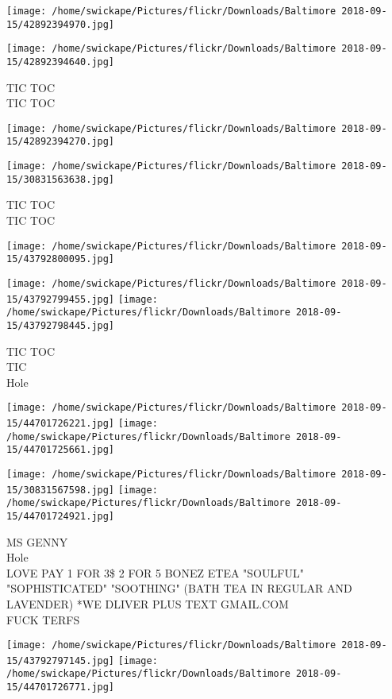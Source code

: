 \documentclass[10pt,letterpaper]{article}
\begin{document}
\texttt{[image: /home/swickape/Pictures/flickr/Downloads/Baltimore 2018-09-15/42892394970.jpg]}

\vspace{0.25in}
\texttt{[image: /home/swickape/Pictures/flickr/Downloads/Baltimore 2018-09-15/42892394640.jpg]}

TIC TOC\\
TIC TOC
\pagebreak

\texttt{[image: /home/swickape/Pictures/flickr/Downloads/Baltimore 2018-09-15/42892394270.jpg]}

\vspace{0.25in}
\texttt{[image: /home/swickape/Pictures/flickr/Downloads/Baltimore 2018-09-15/30831563638.jpg]}

TIC TOC\\
TIC TOC
\pagebreak

\texttt{[image: /home/swickape/Pictures/flickr/Downloads/Baltimore 2018-09-15/43792800095.jpg]}

\vspace{0.25in}
\texttt{[image: /home/swickape/Pictures/flickr/Downloads/Baltimore 2018-09-15/43792799455.jpg]}
\texttt{[image: /home/swickape/Pictures/flickr/Downloads/Baltimore 2018-09-15/43792798445.jpg]}

TIC TOC\\
TIC\\
Hole
\pagebreak

\texttt{[image: /home/swickape/Pictures/flickr/Downloads/Baltimore 2018-09-15/44701726221.jpg]}
\texttt{[image: /home/swickape/Pictures/flickr/Downloads/Baltimore 2018-09-15/44701725661.jpg]}

\texttt{[image: /home/swickape/Pictures/flickr/Downloads/Baltimore 2018-09-15/30831567598.jpg]}
\texttt{[image: /home/swickape/Pictures/flickr/Downloads/Baltimore 2018-09-15/44701724921.jpg]}

MS GENNY\\
Hole\\
LOVE PAY 1 FOR 3\$ 2 FOR 5 BONEZ ETEA "SOULFUL" "SOPHISTICATED" "SOOTHING" (BATH TEA IN REGULAR AND LAVENDER) *WE DLIVER PLUS TEXT GMAIL.COM\\
FUCK TERFS
\pagebreak

\texttt{[image: /home/swickape/Pictures/flickr/Downloads/Baltimore 2018-09-15/43792797145.jpg]}
\texttt{[image: /home/swickape/Pictures/flickr/Downloads/Baltimore 2018-09-15/44701726771.jpg]}
\end{document}
